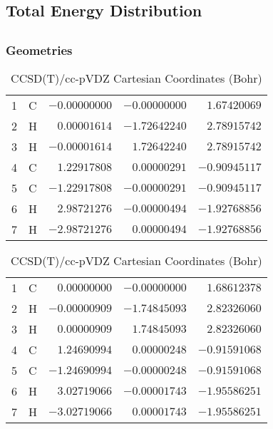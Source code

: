 \documentclass[10pt,oneside]{article}
\begin{document}
\begin{table}
\subsection*{Total Energy Distribution}
\centering\end{table}

\clearpage

\subsection{}

\begin{table}[h!]
\subsubsection*{Geometries}
\begin{multicols}{2}
\centering
\caption{CCSD(T)/cc-pVTZ Cartesian Coordinates (Bohr)}
\begin{tabular}{llrrr}
\toprule
1  & C  & $-0.00000000$ & $-0.00000000$ & $ 1.67420069$ \\
2  & H  & $ 0.00001614$ & $-1.72642240$ & $ 2.78915742$ \\
3  & H  & $-0.00001614$ & $ 1.72642240$ & $ 2.78915742$ \\
4  & C  & $ 1.22917808$ & $ 0.00000291$ & $-0.90945117$ \\
5  & C  & $-1.22917808$ & $-0.00000291$ & $-0.90945117$ \\
6  & H  & $ 2.98721276$ & $-0.00000494$ & $-1.92768856$ \\
7  & H  & $-2.98721276$ & $ 0.00000494$ & $-1.92768856$ \\
\bottomrule
\end{tabular}
\caption{CCSD(T)/cc-pVDZ Cartesian Coordinates (Bohr)}
\begin{tabular}{llrrr}
\toprule
1  & C  & $ 0.00000000$ & $-0.00000000$ & $ 1.68612378$ \\
2  & H  & $-0.00000909$ & $-1.74845093$ & $ 2.82326060$ \\
3  & H  & $ 0.00000909$ & $ 1.74845093$ & $ 2.82326060$ \\
4  & C  & $ 1.24690994$ & $ 0.00000248$ & $-0.91591068$ \\
5  & C  & $-1.24690994$ & $-0.00000248$ & $-0.91591068$ \\
6  & H  & $ 3.02719066$ & $-0.00001743$ & $-1.95586251$ \\
7  & H  & $-3.02719066$ & $ 0.00001743$ & $-1.95586251$ \\
\bottomrule
\end{tabular}
\end{multicols}
\end{table}
\end{document}
